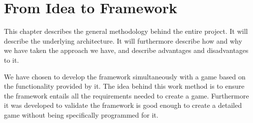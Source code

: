 \chapter{From Idea to Framework}

This chapter describes the general methodology behind the entire project. It will describe the underlying architecture. It will furthermore describe how and why we have taken the approach we have, and describe advantages and disadvantages to it.

We have chosen to develop the framework simultaneously with a game based on the functionality provided by it. The idea behind this work method is to ensure the framework entails all the requirements needed to create a game. Furthermore it was developed to validate the framework is good enough to create a detailed game without being specifically programmed for it.





